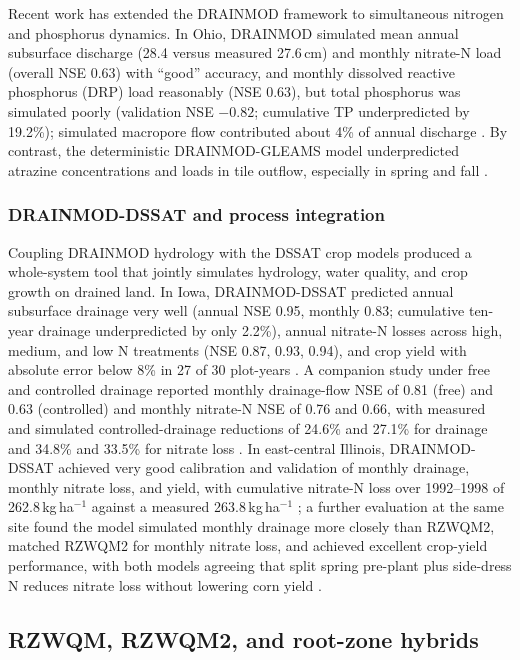 \documentclass[11pt]{article}
\begin{document}
Recent work has extended the DRAINMOD framework to simultaneous nitrogen and phosphorus dynamics. In Ohio, DRAINMOD simulated mean annual subsurface discharge (28.4 versus measured 27.6\,cm) and monthly nitrate-N load (overall NSE 0.63) with ``good'' accuracy, and monthly dissolved reactive phosphorus (DRP) load reasonably (NSE 0.63), but total phosphorus was simulated poorly (validation NSE $-0.82$; cumulative TP underpredicted by 19.2\%); simulated macropore flow contributed about 4\% of annual discharge \parencite{Askar2025}. By contrast, the deterministic DRAINMOD-GLEAMS model underpredicted atrazine concentrations and loads in tile outflow, especially in spring and fall \parencite{Rudra2005}.

\subsubsection{DRAINMOD-DSSAT and process integration}

Coupling DRAINMOD hydrology with the DSSAT crop models produced a whole-system tool that jointly simulates hydrology, water quality, and crop growth on drained land. In Iowa, DRAINMOD-DSSAT predicted annual subsurface drainage very well (annual NSE 0.95, monthly 0.83; cumulative ten-year drainage underpredicted by only 2.2\%), annual nitrate-N losses across high, medium, and low N treatments (NSE 0.87, 0.93, 0.94), and crop yield with absolute error below 8\% in 27 of 30 plot-years \parencite{Negm2014}. A companion study under free and controlled drainage reported monthly drainage-flow NSE of 0.81 (free) and 0.63 (controlled) and monthly nitrate-N NSE of 0.76 and 0.66, with measured and simulated controlled-drainage reductions of 24.6\% and 27.1\% for drainage and 34.8\% and 33.5\% for nitrate loss \parencite{Negm2017}. In east-central Illinois, DRAINMOD-DSSAT achieved very good calibration and validation of monthly drainage, monthly nitrate loss, and yield, with cumulative nitrate-N loss over 1992--1998 of 262.8\,kg\,ha$^{-1}$ against a measured 263.8\,kg\,ha$^{-1}$ \parencite{Singh2020b}; a further evaluation at the same site found the model simulated monthly drainage more closely than RZWQM2, matched RZWQM2 for monthly nitrate loss, and achieved excellent crop-yield performance, with both models agreeing that split spring pre-plant plus side-dress N reduces nitrate loss without lowering corn yield \parencite{Singh2022c}.

\subsection{RZWQM, RZWQM2, and root-zone hybrids}
\end{document}
